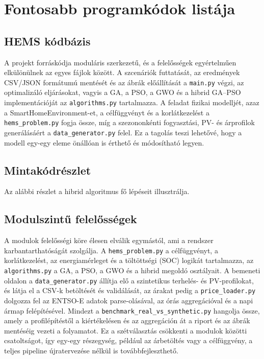 \chapter{Fontosabb programkódok listája}\label{ch:progik}

\section{HEMS kódbázis}
A projekt forráskódja moduláris szerkezetű, és a felelősségek egyértelműen elkülönülnek az egyes fájlok között. A szcenáriók futtatását, az eredmények CSV/JSON formátumú mentését és az ábrák előállítását a \texttt{main.py} végzi, az optimalizáló eljárásokat, vagyis a GA, a PSO, a GWO és a hibrid GA--PSO implementációját az \texttt{algorithms.py} tartalmazza. A feladat fizikai modelljét, azaz a SmartHomeEnvironment-et, a célfüggvényt és a korlátkezelést a \texttt{hems\_problem.py} fogja össze, míg a szezononkénti fogyasztási, PV- és árprofilok generálásáért a \texttt{data\_generator.py} felel. Ez a tagolás teszi lehetővé, hogy a modell egy-egy eleme önállóan is érthető és módosítható legyen.

\section{Mintakódrészlet}
Az alábbi részlet a hibrid algoritmus fő lépéseit illusztrálja.


\section{Modulszintű felelősségek}
A modulok felelősségi köre élesen elválik egymástól, ami a rendszer karbantarthatóságát szolgálja. A \texttt{hems\_problem.py} a célfüggvényt, a korlátkezelést, az energiamérleget és a töltöttségi (SOC) logikát tartalmazza, az \texttt{algorithms.py} a GA, a PSO, a GWO és a hibrid megoldó osztályait. A bemeneti oldalon a \texttt{data\_generator.py} állítja elő a szintetikus terhelés- és PV-profilokat, és látja el a CSV-k betöltését és validálását, az árakat pedig a \texttt{price\_loader.py} dolgozza fel az ENTSO-E adatok parse-olásával, az órás aggregációval és a napi ármap felépítésével. Mindezt a \texttt{benchmark\_real\_vs\_synthetic.py} hangolja össze, amely a profilépítéstől a kiértékelésen és az aggregáción át a riport és az ábrák mentéséig vezeti a folyamatot. Ez a szétválasztás csökkenti a modulok közötti csatoltságot, így egy-egy részegység, például az árbetöltés vagy a célfüggvény, a teljes pipeline újratervezése nélkül is továbbfejleszthető.

